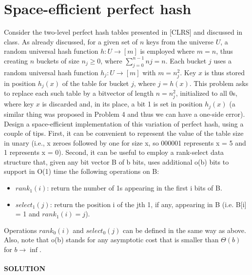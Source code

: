 \documentclass[a4paper]{article}
\begin{document}
\section*{Space-efficient perfect hash}
Consider the two-level perfect hash tables presented in [CLRS] and discussed in class. As already discussed, for a given set of $n$ keys from
the universe $U$, a random universal hash function $h : U \rightarrow [m]$ is employed where $m = n$, thus creating $n$ buckets of size $n_j \geq 0$, where $\sum^{n−1}_{j=0} nj = n$. Each bucket $j$ uses a random universal hash function $h_j: U \rightarrow [m]$ with $m = n_j^2$. Key $x$ is thus stored in
position $h_j (x)$ of the table for bucket $j$, where $j = h(x)$.
This problem asks to replace each such table by a bitvector of length $n=n_j^2$, initialized to all 0s, where key $x$ is discarded and, in its place, a bit 1 is set in position $h_j (x)$ (a similar thing was proposed in Problem 4 and thus we can have a one-side error). Design
a space-efficient implementation of this variation of perfect hash, using a couple of tips. First, it can be convenient to represent the value of the table size in unary (i.e., x zeroes followed by one for size x, so 000001 represents x = 5 and 1 represents x = 0). Second, it can be useful to employ a rank-select data structure that, given any bit vector B of b bits, uses additional o(b) bits to support in O(1) time the following operations on B:
\begin{itemize}
\item $rank_1(i)$: return the number of 1s appearing in the first i bits of B.
\item $select_1(j)$: return the position i of the jth 1, if any, appearing in B (i.e. B[i] = 1 and $rank_1(i) = j$).
\end{itemize}
Operations $rank_0(i)$ and $select_0(j)$ can be defined in the same way as above. Also, note that o(b) stands for any asymptotic cost that is smaller than $\Theta(b)$ for $b \rightarrow \inf$.
\\
\\
\textbf{SOLUTION}
\\
\\
\end{document}
